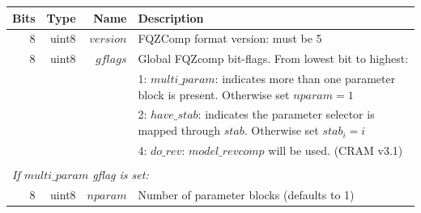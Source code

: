 \documentclass[a4paper]{article}
\begin{document}
\begin{table}
\centering
\begin{tabular}{|r|r|r|r|r|p{8cm}|l|l|}
\hline
\multicolumn{3}{|r|}{\textbf{Bits} }                   & \textbf{Type}  & \textbf{Name}                  & \multicolumn{3}{p{8.8cm}|}{\textbf{Description}} \\
\hline
\multicolumn{3}{|r|}{8}                                & uint8          & $version$                      & \multicolumn{3}{p{8.8cm}|}{FQZComp format version: must be 5}\\
\hline
\multicolumn{3}{|r|}{8}                                & uint8          & $gflags$                       & \multicolumn{3}{p{8.8cm}|}{Global FQZcomp bit-flags. From lowest bit to highest:}\\
\multicolumn{3}{|r|}{}                                 &                &                                & \multicolumn{3}{p{8.8cm}|}{1: $multi\_param$: indicates more than one parameter block is present.  Otherwise set $nparam = 1$} \\
\multicolumn{3}{|r|}{}                                 &                &                                & \multicolumn{3}{p{8.8cm}|}{2: $have\_stab$: indicates the parameter selector is mapped through $stab$.  Otherwise set $stab_i = i$} \\
\multicolumn{3}{|r|}{}                                 &                &                                & \multicolumn{3}{p{8.8cm}|}{4: $do\_rev$: $model\_revcomp$ will be used. (CRAM v3.1)} \\
\hline

\multicolumn{8}{|l|}{}\\[-0.7em]
\multicolumn{8}{|l|}{\textit{If $multi\_param$ gflag is set:} } \\
\cline{2-7}
                       & \multicolumn{2}{r|}{8}        & uint8          & \multicolumn{1}{r|}{$nparam$ } & \multicolumn{2}{p{8.4cm}|}{Number of parameter blocks (defaults to 1)} & \\
\cline{2-7}


\end{tabular}
\end{table}
\end{document}
